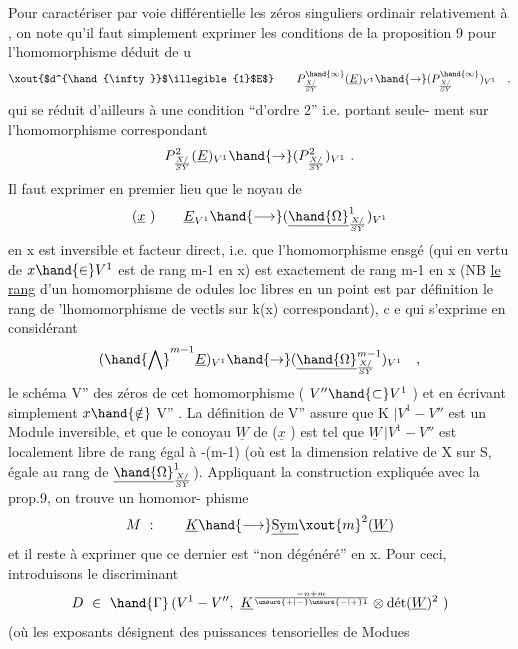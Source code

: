 
Pour caractériser par voie différentielle  les  zéros singuliers ordinair
relativement à ,  on note qu'il faut simplement exprimer  les conditions
de la proposition 9  pour  l'homomorphisme  déduit de u
\[ \xout{$d^{\hand{\infty}}$\illegible{1}$E$} \qquad P^{\hand{\infty}}_{X/\over{S}{Y}}(\underline{E})_{V^1}\hand{\to}(P^{\hand{\infty}}_{X/\over{S}{Y}})_{V^1} \quad , \]
qui se réduit d'ailleurs à une condition  ``d'ordre 2'' i.e. portant seule-%
ment sur l'homomorphisme correspondant
\[ P^{2}_{X/\over{S}{Y}}(\underline{E})_{V^1}\hand{\to}(P^{2}_{X/\over{S}{Y}})_{V^1} \ . \]
Il faut exprimer en premier lieu  que  le noyau  de
\[ (\underline{x}\ ) \qquad \underline{E}_{V^1} \hand{\longrightarrow} (\underline{\hand{\Omega}}^{1}_{X/\over{S}{Y}})_{V^1} \]
en x est inversible et facteur direct, i.e. que l'homomorphisme ensgé
(qui en vertu de  $x\hand{\in} V^1$ est  de rang  m-1 en x) est exactement de rang
\margin{(} m-1 en x  (NB \uline{le rang} d'un  homomorphisme de odules loc libres en un
point est par définition le rang de 'lhomomorphisme de vectls sur k(x)
correspondant), c e qui s'exprime en considérant
\[ (\hand{\bigwedge}^{m-1} \underline{E})_{V^1}\hand{\to}(\underline{\hand{\Omega}}^{m-1}_{X/\over{S}{Y}})_{V^1} \quad , \]
le  schéma  V'' des zéros de cet homomorphisme  ( $V''\hand{\subset} V^1$ )  et en écrivant
simplement $x\hand{\notin}$ V'' .  La définition de V'' assure que  K $|V^1-V''$  est un
Module inversible,  et que  le conoyau  $\underline{W}$  de ($\underline{x}$ )  est tel que
$\underline{W}\,|V^1-V''$  est  localement libre de rang égal à  -(m-1)  (où  est la
dimension relative de X sur S, égale au rang de $\underline{\hand{\Omega}}^{1}_{X/\over{S}{Y}}$).  Appliquant la
construction expliquée avec la prop.9\hand{$^{*}$}, on trouve  un homomor-%
phisme
\[ M\ : \qquad \underline{K} \hand{\longrightarrow} \underline{\mathrm{Sym}}\xout{m}^{2}(\underline{W}) \]
et il reste à exprimer que ce dernier est ``non dégénéré'' en x. Pour ceci,
introduisons le  discriminant
\[ D\ \in\ \hand{\Gamma}\,(V^1-V'',\ \underline{K}^{-n+m\over{\unsure{+|-}}{\unsure{-|+}}1}\otimes \text{dét}(\underline{W})^{2}\ ) \]
(où les exposants désignent des puissances tensorielles de Modues

